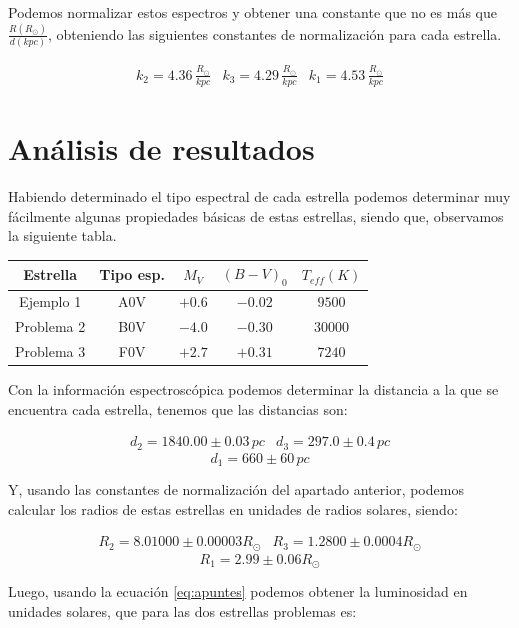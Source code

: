 \documentclass{aa} %
\begin{document}
Podemos normalizar estos espectros y obtener una constante que no es más que $\frac{R (R_{\odot})}{d (kpc)}$, obteniendo las siguientes constantes de normalización para cada estrella.

$$
\begin{array}{ccc}
k_2 = 4.36 \, \frac{R_{\odot}}{kpc} & k_3 = 4.29 \, \frac{R_{\odot}}{kpc} & k_1 = 4.53 \, \frac{R_{\odot}}{kpc}
\end{array}
$$

\section{Análisis de resultados}

Habiendo determinado el tipo espectral de cada estrella  podemos determinar muy fácilmente algunas propiedades básicas de estas estrellas, siendo que, observamos la siguiente tabla.

\begin{center}
\begin{tabular}{ccccc}
\hline \hline
Estrella & Tipo esp. & $M_V$ & $(B-V)_0$ & $T_{eff} (K)$ \\ \hline
Ejemplo 1 & A0V & $+0.6$ & $-0.02$ & $9500$ \\
Problema 2 & B0V & $-4.0$ & $-0.30$ & $30000$ \\
Problema 3 & F0V & $+2.7$ & $+0.31$ & $7240$ \\
\hline \hline
\end{tabular}
\end{center}

Con la información espectroscópica podemos determinar la distancia a la que se encuentra cada estrella, tenemos que las distancias son:

$$
\begin{array}{cc}
d_2 = 1840.00 \pm 0.03 \, pc & d_3 = 297.0 \pm 0.4 \, pc
\end{array}
$$
$$
d_1 = 660 \pm 60 \, pc
$$

Y, usando las constantes de normalización del apartado anterior, podemos calcular los radios de estas estrellas en unidades de radios solares, siendo:

$$
\begin{array}{cc}
R_2 = 8.01000 \pm 0.00003 R_{\odot} & R_3 = 1.2800 \pm 0.0004 R_{\odot}
\end{array}
$$
$$
R_1 = 2.99 \pm 0.06 R_{\odot}
$$

Luego, usando la ecuación \ref{eq:apuntes} podemos obtener la luminosidad en unidades solares, que para las dos estrellas problemas es:
\end{document}
